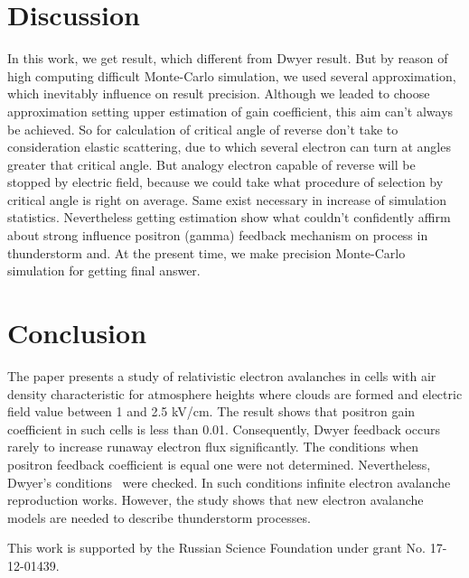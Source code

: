 \documentclass{webofc}
\begin{document}
\section{Discussion}
In this work, we get result, which different from Dwyer result. But by reason of high computing difficult Monte-Carlo simulation, we used several approximation, which inevitably influence on result precision. Although we leaded to choose approximation setting upper estimation of gain coefficient, this aim can't always be achieved. So for calculation of critical angle of reverse don't take to consideration elastic scattering, due to which several electron can turn at angles greater that critical angle. But analogy electron capable of reverse will be stopped by electric field, because we could take what procedure of selection by critical angle is right on average. Same exist necessary in increase of simulation statistics. Nevertheless getting estimation show what couldn't confidently affirm about strong influence positron (gamma) feedback mechanism on process in thunderstorm and. At the present time, we make precision Monte-Carlo simulation for getting final answer.

\section{Conclusion}
The paper presents a study of relativistic electron avalanches in cells with air density characteristic for atmosphere heights where clouds are formed and electric field value between 1 and 2.5 kV/cm. The result shows that positron gain coefficient in such cells is less than 0.01. Consequently, Dwyer feedback occurs rarely to increase runaway electron flux significantly.
The conditions when positron feedback coefficient is equal one were not determined. Nevertheless, Dwyer’s conditions~\cite{dwyer2003fundamental} were checked. In such conditions infinite electron avalanche reproduction works. However, the study shows that new electron avalanche models are needed to describe thunderstorm processes.

This work is supported by the Russian Science Foundation under grant No. 17-12-01439.
   
{}
\end{document}
